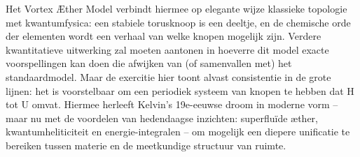 Het Vortex Æther Model verbindt hiermee op elegante wijze klassieke topologie met kwantumfysica: een stabiele torusknoop is een deeltje, en de chemische orde der elementen wordt een verhaal van welke knopen mogelijk zijn. Verdere kwantitatieve uitwerking zal moeten aantonen in hoeverre dit model exacte voorspellingen kan doen die afwijken van (of samenvallen met) het standaardmodel. Maar de exercitie hier toont alvast consistentie in de grote lijnen: het is voorstelbaar om een periodiek systeem van knopen te hebben dat H tot U omvat. Hiermee herleeft Kelvin’s 19e-eeuwse droom in moderne vorm – maar nu met de voordelen van hedendaagse inzichten: superfluïde æther, kwantumheliticiteit en energie-integralen – om mogelijk een diepere unificatie te bereiken tussen materie en de meetkundige structuur van ruimte.